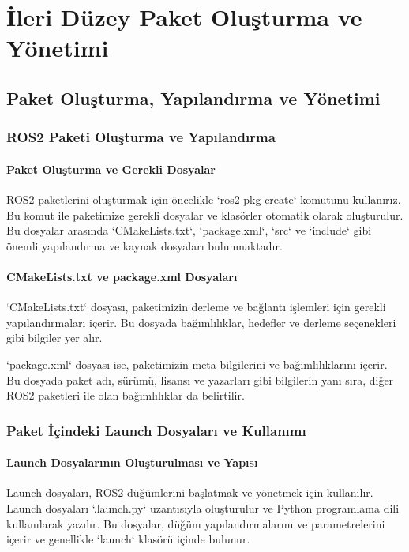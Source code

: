 \chapter{İleri Düzey Paket Oluşturma ve Yönetimi}

\section{Paket Oluşturma, Yapılandırma ve Yönetimi}
    \subsection{ROS2 Paketi Oluşturma ve Yapılandırma}
        \subsubsection{Paket Oluşturma ve Gerekli Dosyalar}
            ROS2 paketlerini oluşturmak için öncelikle `ros2 pkg create` komutunu kullanırız. Bu komut ile paketimize gerekli dosyalar ve klasörler otomatik olarak oluşturulur. Bu dosyalar arasında `CMakeLists.txt`, `package.xml`, `src` ve `include` gibi önemli yapılandırma ve kaynak dosyaları bulunmaktadır.

        \subsubsection{CMakeLists.txt ve package.xml Dosyaları}
            `CMakeLists.txt` dosyası, paketimizin derleme ve bağlantı işlemleri için gerekli yapılandırmaları içerir. Bu dosyada bağımlılıklar, hedefler ve derleme seçenekleri gibi bilgiler yer alır.

            `package.xml` dosyası ise, paketimizin meta bilgilerini ve bağımlılıklarını içerir. Bu dosyada paket adı, sürümü, lisansı ve yazarları gibi bilgilerin yanı sıra, diğer ROS2 paketleri ile olan bağımlılıklar da belirtilir.

    \subsection{Paket İçindeki Launch Dosyaları ve Kullanımı}
        \subsubsection{Launch Dosyalarının Oluşturulması ve Yapısı}
            Launch dosyaları, ROS2 düğümlerini başlatmak ve yönetmek için kullanılır. Launch dosyaları `.launch.py` uzantısıyla oluşturulur ve Python programlama dili kullanılarak yazılır. Bu dosyalar, düğüm yapılandırmalarını ve parametrelerini içerir ve genellikle `launch` klasörü içinde bulunur.


